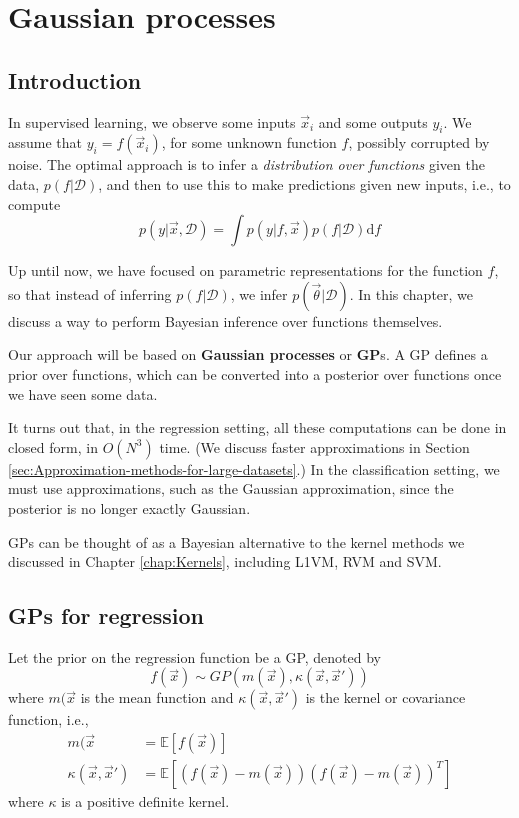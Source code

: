 \chapter{Gaussian processes}
\label{Gaussian Processes}


\section{Introduction}
In supervised learning, we observe some inputs $\vec{x}_i$ and some outputs $y_i$. We assume that $y_i =f(\vec{x}_i)$, for some unknown function $f$, possibly corrupted by noise. The optimal approach is to infer a \emph{distribution over functions} given the data, $p(f|\mathcal{D})$, and then to use this to make predictions given new inputs, i.e., to compute
\begin{equation}
p(y|\vec{x},\mathcal{D})=\int p(y|f,\vec{x})p(f|\mathcal{D})\mathrm{d}f
\end{equation}

Up until now, we have focused on parametric representations for the function $f$, so that instead of inferring $p(f|\mathcal{D})$, we infer $p(\vec{\theta}|\mathcal{D})$. In this chapter, we discuss a way to perform Bayesian inference over functions themselves.

Our approach will be based on \textbf{Gaussian processes} or \textbf{GP}s. A GP defines a prior over functions, which can be converted into a posterior over functions once we have seen some data. 

It turns out that, in the regression setting, all these computations can be done in closed form, in $O(N^3)$ time. (We discuss faster approximations in Section \ref{sec:Approximation-methods-for-large-datasets}.) In the classification setting, we must use approximations, such as the Gaussian approximation, since the posterior is no longer exactly Gaussian.

GPs can be thought of as a Bayesian alternative to the kernel methods we discussed in Chapter \ref{chap:Kernels}, including L1VM, RVM and SVM.


\section{GPs for regression}
Let the prior on the regression function be a GP, denoted by
\begin{equation}
f(\vec{x}) \sim GP(m(\vec{x}),\kappa(\vec{x},\vec{x}'))
\end{equation}
where $m(\vec{x}$ is the mean function and $\kappa(\vec{x},\vec{x}')$ is the kernel or covariance function, i.e.,
\begin{align}
m(\vec{x} & = \mathbb{E}[f(\vec{x})] \\
\kappa(\vec{x},\vec{x}') & = \mathbb{E}[(f(\vec{x})-m(\vec{x}))(f(\vec{x})-m(\vec{x}))^T]
\end{align}
where $\kappa$ is a positive definite kernel.


